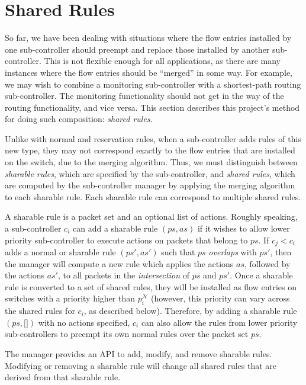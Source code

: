 \documentclass{article}
\begin{document}
\section{Shared Rules} \label{SHR}

So far, we have been dealing with situations where the flow entries installed
by one sub-controller should preempt and replace those installed by another
sub-controller. This is not flexible enough for all applications, as 
there are many instances where the flow entries should be ``merged'' in 
some way. For example, we may wish to combine a monitoring sub-controller
with a shortest-path routing sub-controller. 
The monitoring functionality should not get in the way of the 
routing functionality, and vice versa.
This section describes this project's method for doing such composition:
\emph{shared rules}.

Unlike with normal and reservation rules, when a sub-controller adds rules of this 
new type, they may not correspond exactly to the flow entries that are
installed on the switch, due to the merging algorithm. 
Thus, we must distinguish between \emph{sharable rules},
which are specified by the sub-controller, and \emph{shared rules},
which are computed by the sub-controller manager by applying 
the merging algorithm to each sharable rule.
Each sharable rule can correspond to multiple shared rules.

A sharable rule is a packet set and an optional list of actions.
Roughly speaking, a sub-controller $c_i$ can add a 
sharable rule $(ps, as)$ if it wishes to allow
lower priority sub-controller to execute actions on packets
that belong to $ps$. 
If $c_j < c_i$ adds a normal or sharable rule $(ps', as')$ such
that $ps$ \emph{overlaps} with $ps'$, then the manager will compute a new
rule which applies the actions $as$, followed by the actions $as'$, 
to all packets in the \emph{intersection} of $ps$ and $ps'$.
Once a sharable rule is converted to a set of shared rules, they will 
be installed as flow entries on switches with a priority higher 
than $p_i^{\mathcal{N}}$
(however, this priority can vary across the shared rules 
for $c_i$, as described below).
Therefore, by adding a sharable rule $(ps, \texttt{[]})$ with no actions specified,
$c_i$ can also allow the rules from lower priority sub-controllers to preempt 
its own normal rules over the packet set $ps$.

The manager provides an API to add, modify, and remove sharable rules.
Modifying or removing a sharable rule will change all shared rules that 
are derived from that sharable rule.
\end{document}

